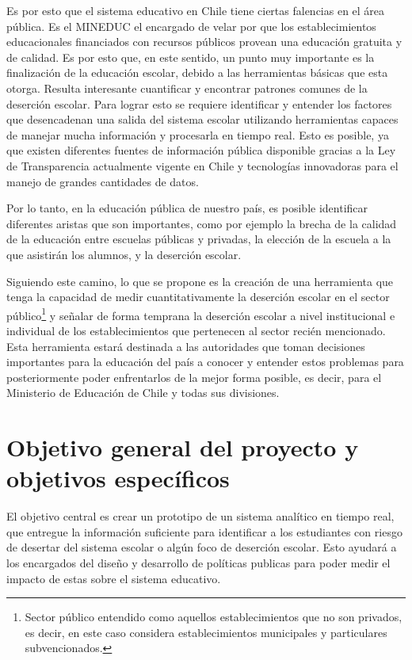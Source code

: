Es por esto que el sistema educativo en Chile tiene ciertas falencias en el área pública. Es el MINEDUC el encargado de velar por que los establecimientos educacionales financiados con recursos públicos provean una educación gratuita y de calidad. Es por esto que, en este sentido, un punto muy importante es la finalización de la educación escolar, debido a las herramientas básicas que esta otorga. Resulta interesante cuantificar y encontrar patrones comunes de la deserción escolar. Para lograr esto se requiere identificar y entender los factores que desencadenan una salida del sistema escolar utilizando herramientas capaces de manejar mucha información y procesarla en tiempo real. Esto es posible, ya que existen diferentes fuentes de información pública disponible gracias a la Ley de Transparencia \cite{ley} actualmente vigente en Chile y tecnologías innovadoras para el manejo de grandes cantidades de datos.

Por lo tanto, en la educación pública de nuestro país, es posible identificar diferentes aristas que son importantes, como por ejemplo la brecha de la calidad de la educación entre escuelas públicas y privadas, la elección de la escuela a la que asistirán los alumnos, y la deserción escolar.

Siguiendo este camino, lo que se propone es la creación de una herramienta que tenga la capacidad de medir cuantitativamente la deserción escolar en el sector público\footnote{Sector público entendido como aquellos establecimientos que no son privados, es decir, en este caso considera establecimientos municipales y particulares subvencionados.} y señalar de forma temprana la deserción escolar a nivel institucional e individual de los establecimientos que pertenecen al sector recién mencionado.
Esta herramienta estará destinada a las autoridades que toman decisiones importantes para la educación del país a conocer y entender estos problemas para posteriormente poder enfrentarlos de la mejor forma posible, es decir, para el Ministerio de Educación de Chile y todas sus divisiones. 


\section{Objetivo general del proyecto y objetivos específicos}
El objetivo central es crear un prototipo de un sistema analítico en tiempo real, que entregue la información suficiente para identificar a los estudiantes con riesgo de desertar del sistema escolar o algún foco de deserción escolar. Esto ayudará a los encargados del diseño y desarrollo de políticas publicas para poder medir el impacto de estas sobre el sistema educativo.

